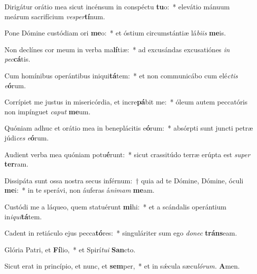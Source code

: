 \item Dirigátur orátio mea sicut incénsum in conspéctu \textbf{tu}o:~* elevátio mánuum meárum sacrifícium \textit{vesper}\textbf{tí}num.
\item Pone Dómine custódiam ori \textbf{me}o:~* et óstium circumstántiæ lá\textit{biis} \textbf{me}is.
\item Non declínes cor meum in verba ma\textbf{lí}tiæ:~* ad excusándas excusatiónes \textit{in} \textit{pec}\textbf{cá}tis.
\item Cum homínibus operántibus iniqui\textbf{tá}tem:~* et non communicábo cum elé\tinyhspace\textit{ctis} \textit{e}\textbf{ó}rum.
\item Corrípiet me justus in misericórdia, et incre\textbf{pá}bit me:~* óleum autem peccatóris non impínguet \textit{caput} \textbf{me}um.
\item Quóniam adhuc et orátio mea in beneplácitis e\textbf{ó}rum:~* absórpti sunt juncti petræ júdi\tinyhspace\textit{ces} \textit{e}\textbf{ó}rum.
\item Audient verba mea quóniam potu\textbf{é}runt:~* sicut crassitúdo terræ erúpta est \textit{super} \textbf{ter}ram.
\item Dissipáta sunt ossa nostra secus inférnum:~† quia ad te Dómine, Dómine, óculi \textbf{me}i:~* in te sperávi, non áuferas á\tinyhspace\textit{nimam} \textbf{me}am.
\item Custódi me a láqueo, quem statuérunt \textbf{mi}hi:~* et a scándalis operántium in\tinyhspace\textit{iqui}\textbf{tá}tem.
\item Cadent in retiáculo ejus pecca\textbf{tó}res:~* singuláriter sum ego \textit{donec} \textbf{tráns}eam.
\item Glória Patri, et \textbf{Fí}lio,~* et Spirí\textit{tui} \textbf{San}cto.
\item Sicut erat in princípio, et nunc, et \textbf{sem}per,~* et in sǽcula sæcu\tinyhspace\textit{lórum.} \textbf{A}men.
